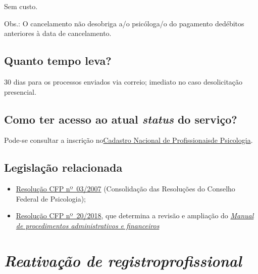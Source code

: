 Sem custo.

Obs.: O cancelamento não desobriga a/o psicóloga/o do pagamento dedébitos anteriores à data de cancelamento.

\section{Quanto tempo leva?}

30 dias para os processos enviados via correio; imediato no caso desolicitação presencial.

\section{Como ter acesso ao atual \emph{status} do serviço?}

Pode-se consultar a inscrição no\href{https://cadastro.cfp.org.br/}{Cadastro Nacional de Profissionaisde Psicologia}.

\section{Legislação relacionada}

\begin{itemize}
  \item  \href{https://atosoficiais.com.br/cfp/resolucao-administrativa-financeira-n-3-2007-institui-a-consolidacao-das-resolucoes-do-conselho-federal-de-psicologia?origin=instituicao&q=resolu\%C3\%A7\%C3\%A3o\%203/2007}{Resolução  CFP nº~03/2007} (Consolidação das Resoluções do Conselho Federal de  Psicologia);
  \item  \href{https://transparencia.cfp.org.br/wp-content/uploads/sites/7/2020/05/Manual-de-Procedimentos-Administrativos-e-Financeiro-CFP-RES-20.2018.pdf}{\href{https://atosoficiais.com.br/cfp/resolucao-administrativa-financeira-n-20-2018-altera-o-manual-de-procedimentos-administrativo-e-financeiro-do-sistema-conselhos-de-psicologia-anexo-da-resolucao-cfp-n-202018-a-resolucao-cfp-n-03-2007-a-resolucao-cfp-n-16-2019-e-da-outras-providencias}{Resolução  CFP nº~20/2018}}, que determina a revisão e ampliação do  \href{https://transparencia.cfp.org.br/wp-content/uploads/sites/7/2020/05/Manual-de-Procedimentos-Administrativos-e-Financeiro-CFP-RES-20.2018.pdf}{\emph{Manual  de procedimentos administrativos e financeiros}}
\end{itemize}

\chapter{\texorpdfstring{\emph{Reativação de registroprofissional}}{Reativação de registro profissional}}


